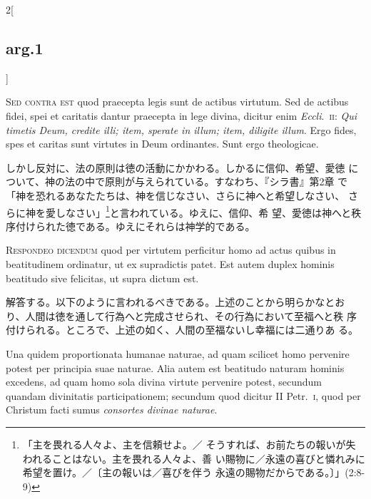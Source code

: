 \documentclass[paper=a4paper,fontsize=10pt,jafontsize=9pt,titlepage]{jlreq}
\begin{document}
\begin{paracol}{2}[\subsection{arg.1}]
\switchcolumn*[\subsection{s.c.}]

{\scshape Sed contra est} quod praecepta legis sunt de actibus
virtutum. Sed de actibus fidei, spei et caritatis dantur praecepta in
lege divina, dicitur enim {\itshape Eccli}.~{\scshape ii}: {\itshape
Qui timetis Deum, credite illi; item, sperate in illum; item, diligite
illum}. Ergo fides, spes et caritas sunt virtutes in Deum
ordinantes. Sunt ergo theologicae.

\switchcolumn

しかし反対に、法の原則は徳の活動にかかわる。しかるに信仰、希望、愛徳
 について、神の法の中で原則が与えられている。すなわち、『シラ書』第2章
 で「神を恐れるあなたたちは、神を信じなさい、さらに神へと希望しなさい、
 さらに神を愛しなさい」\footnote{「主を畏れる人々よ、主を信頼せよ。／
 そうすれば、お前たちの報いが失われることはない。主を畏れる人々よ、善
 い賜物に／永遠の喜びと憐れみに希望を置け。／〔主の報いは／喜びを伴う
 永遠の賜物だからである。〕」(2:8-9) }と言われている。ゆえに、信仰、希
 望、愛徳は神へと秩序付けられた徳である。ゆえにそれらは神学的である。


{\scshape Respondeo dicendum} quod per virtutem perficitur homo ad
actus quibus in beatitudinem ordinatur, ut ex supradictis patet. Est
autem duplex hominis beatitudo sive felicitas, ut supra dictum
 est.

\switchcolumn

解答する。以下のように言われるべきである。上述のことから明らかなとお
 り、人間は徳を通して行為へと完成させられ、その行為において至福へと秩
 序付けられる。ところで、上述の如く、人間の至福ないし幸福には二通りあ
 る。

\switchcolumn*

Una quidem proportionata humanae naturae, ad quam scilicet homo
pervenire potest per principia suae naturae. Alia autem est beatitudo
naturam hominis excedens, ad quam homo sola divina virtute pervenire
potest, secundum quandam divinitatis participationem; secundum quod
dicitur II Petr.~{\scshape i}, quod  per Christum facti sumus
{\itshape consortes divinae naturae}.

\switchcolumn


\end{paracol}
\end{document}
